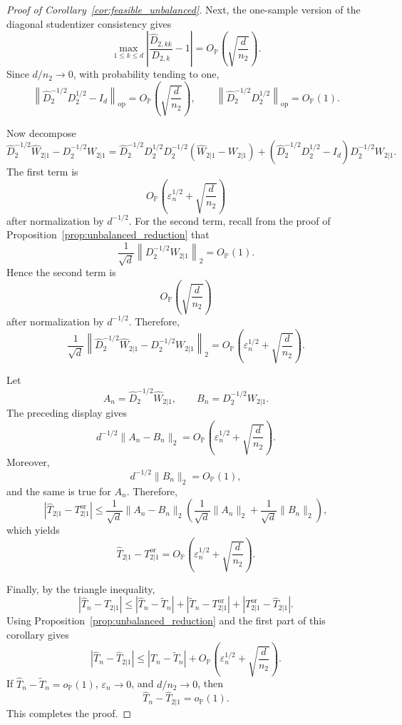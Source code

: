 \documentclass[
  12pt]{article}
\theoremstyle{plain}
\theoremstyle{definition}
\theoremstyle{remark}
\begin{document}
\begin{proof}[Proof of Corollary~\ref{cor:feasible_unbalanced}]
Next, the one-sample version of the diagonal studentizer consistency gives
\[
\max_{1\le k\le d}
\left|
\frac{\widehat D_{2,kk}}{D_{2,k}}-1
\right|
=
O_{\mathbb P}
\left(
\sqrt{\frac d{n_2}}
\right).
\]
Since \(d/n_2\to0\), with probability tending to one,
\[
\left\|
\widehat D_2^{-1/2}D_2^{1/2}-I_d
\right\|_{\mathrm{op}}
=
O_{\mathbb P}
\left(
\sqrt{\frac d{n_2}}
\right),
\qquad
\left\|
\widehat D_2^{-1/2}D_2^{1/2}
\right\|_{\mathrm{op}}
=
O_{\mathbb P}(1).
\]

Now decompose
\[
\widehat D_2^{-1/2}\widehat W_{2|1}
-
D_2^{-1/2}W_{2|1}
=
\widehat D_2^{-1/2}D_2^{1/2}
D_2^{-1/2}(\widehat W_{2|1}-W_{2|1})
+
(\widehat D_2^{-1/2}D_2^{1/2}-I_d)
D_2^{-1/2}W_{2|1}.
\]
The first term is
\[
O_{\mathbb P}
\left(
\varepsilon_n^{1/2}
+
\sqrt{\frac d{n_2}}
\right)
\]
after normalization by \(d^{-1/2}\).  For the second term, recall from the proof
of Proposition~\ref{prop:unbalanced_reduction} that
\[
\frac1{\sqrt d}
\left\|
D_2^{-1/2}W_{2|1}
\right\|_2
=
O_{\mathbb P}(1).
\]
Hence the second term is
\[
O_{\mathbb P}
\left(
\sqrt{\frac d{n_2}}
\right)
\]
after normalization by \(d^{-1/2}\).  Therefore,
\[
\frac1{\sqrt d}
\left\|
\widehat D_2^{-1/2}\widehat W_{2|1}
-
D_2^{-1/2}W_{2|1}
\right\|_2
=
O_{\mathbb P}
\left(
\varepsilon_n^{1/2}
+
\sqrt{\frac d{n_2}}
\right).
\]

Let
\[
A_n=\widehat D_2^{-1/2}\widehat W_{2|1},
\qquad
B_n=D_2^{-1/2}W_{2|1}.
\]
The preceding display gives
\[
d^{-1/2}\|A_n-B_n\|_2
=
O_{\mathbb P}
\left(
\varepsilon_n^{1/2}
+
\sqrt{\frac d{n_2}}
\right).
\]
Moreover,
\[
d^{-1/2}\|B_n\|_2=O_{\mathbb P}(1),
\]
and the same is true for \(A_n\).  Therefore,
\[
\left|
\widehat T_{2|1}-T_{2|1}^{\mathrm{or}}
\right|
\le
\frac1{\sqrt d}\|A_n-B_n\|_2
\left(
\frac1{\sqrt d}\|A_n\|_2
+
\frac1{\sqrt d}\|B_n\|_2
\right),
\]
which yields
\[
\widehat T_{2|1}
-
T_{2|1}^{\mathrm{or}}
=
O_{\mathbb P}
\left(
\varepsilon_n^{1/2}
+
\sqrt{\frac d{n_2}}
\right).
\]

Finally, by the triangle inequality,
\[
|\widehat T_n-\widehat T_{2|1}|
\le
|\widehat T_n-\widetilde T_n|
+
|\widetilde T_n-T_{2|1}^{\mathrm{or}}|
+
|T_{2|1}^{\mathrm{or}}-\widehat T_{2|1}|.
\]
Using Proposition~\ref{prop:unbalanced_reduction} and the first part of this
corollary gives
\[
|\widehat T_n-\widehat T_{2|1}|
\le
|\widehat T_n-\widetilde T_n|
+
O_{\mathbb P}
\left(
\varepsilon_n^{1/2}
+
\sqrt{\frac d{n_2}}
\right).
\]
If \(\widehat T_n-\widetilde T_n=o_{\mathbb P}(1)\), \(\varepsilon_n\to0\),
and \(d/n_2\to0\), then
\[
\widehat T_n-\widehat T_{2|1}=o_{\mathbb P}(1).
\]
This completes the proof.
\end{proof}
\end{document}
